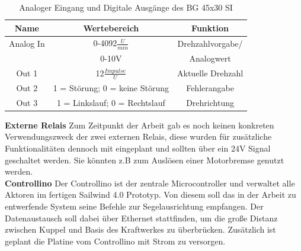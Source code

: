 \begin{table}[H]
	\centering
	\begin{tabular}{|c|c|c|}
		\hline
		\textbf{Name} & \textbf{Wertebereich} & \textbf{Funktion}      \\ \hline
		Analog In                & 0-4092$\frac{U}{min}$                        & Drehzahlvorgabe/            \\ & 0-10V & Analogwert \\ \hline		Out 1                & 12$\frac{Impulse}{U}$                        & Aktuelle Drehzahl             \\ \hline
		Out 2                & 1 = Störung; 0 = keine Störung                        &  Fehlerangabe            \\ \hline
		Out 3              & 1 = Linkslauf; 0 = Rechtslauf                       &  Drehrichtung           \\ \hline
	\end{tabular}%
	\caption{Analoger Eingang und Digitale Ausgänge des BG 45x30 SI}
	\label{tab:andere_Ausgaenge}
\end{table}

\noindent\textbf{Externe Relais}\newline
Zum Zeitpunkt der Arbeit gab es noch keinen konkreten Verwendungszweck der zwei externen Relais, diese wurden für zusätzliche Funktionalitäten dennoch mit eingeplant und sollten über ein 24V Signal geschaltet werden. Sie könnten z.B zum Auslösen einer Motorbremse genutzt werden.\\

\noindent\textbf{Controllino}\newline
Der Controllino ist der zentrale Microcontroller und verwaltet alle Aktoren im fertigen Sailwind 4.0 Prototyp. Von diesem soll das in der Arbeit zu entwerfende System seine Befehle zur Segelausrichtung empfangen. Der Datenaustausch soll dabei über Ethernet stattfinden, um die große Distanz zwischen Kuppel und Basis des Kraftwerkes zu überbrücken. Zusätzlich ist geplant die Platine vom Controllino mit Strom zu versorgen.
